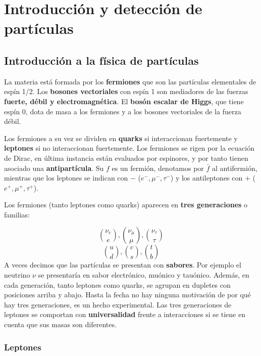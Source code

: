 \chapter{Introducción y detección de partículas}


\section{Introducción a la física de partículas}


La materia está formada por los \textbf{fermiones} que son las partículas elementales de espín 1/2. Los \textbf{bosones vectoriales} con espín 1 son mediadores de las fuerzas \textbf{fuerte, débil y electromagnética}. El \textbf{bosón escalar de Higgs}, que tiene espín 0, dota de masa a los fermiones y a los bosones vectoriales de la fuerza débil.

Los fermiones a su vez se dividen en \textbf{quarks} si  interaccionan fuertemente y \textbf{leptones} si no interaccionan fuertemente. Los fermiones se rigen por la ecuación de Dirac, en última instancia están evaluados por espinores, y por tanto tienen asociado una \textbf{antipartícula}. Su $f$ es un fermión, denotamos por $\bar{f}$ al antifermión, mientras que los leptones se indican con $-$ ($e^-,\mu^-,\tau^-$) y los antileptones con $+$ ($e^+,\mu^+,\tau^+$). 

Los fermiones (tanto leptones como quarks) aparecen en \textbf{tres generaciones} o familias:

\begin{equation}
	\binom{\nu_e}{e} , 
	\binom{\nu_\mu}{\mu} , 
	\binom{\nu_\tau}{\tau} 
\end{equation}
\begin{equation}
	\binom{u}{d} , 
	\binom{c}{s} , 
	\binom{t}{b}
\end{equation}
A veces decimos que las partículas se presentan con \textbf{sabores}. Por ejemplo el neutrino $\nu$ se presentaría en sabor electrónico, muónico y tauónico. Además, en cada generación, tanto leptones como quarks, se agrupan en dupletes con posiciones arriba y abajo. Hasta la fecha no hay ninguna motivación de por qué hay tres generaciones, es un hecho experimental. Las tres generaciones de leptones se comportan con \textbf{universalidad} frente a interacciones si se tiene en cuenta que sus masas son diferentes.

\subsection{Leptones}

